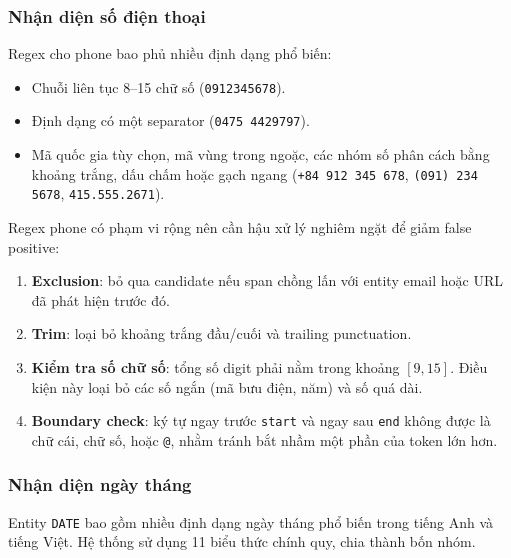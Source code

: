 \subsubsection{Nhận diện số điện thoại}

Regex cho phone bao phủ nhiều định dạng phổ biến:

\begin{itemize}[nosep]
      \item Chuỗi liên tục 8--15 chữ số (\texttt{0912345678}).
      \item Định dạng có một separator (\texttt{0475 4429797}).
      \item Mã quốc gia tùy chọn, mã vùng trong ngoặc, các nhóm số phân cách
            bằng khoảng trắng, dấu chấm hoặc gạch ngang
            (\texttt{+84 912 345 678}, \texttt{(091) 234 5678},
            \texttt{415.555.2671}).
\end{itemize}

Regex phone có phạm vi rộng nên cần hậu xử lý nghiêm ngặt để giảm false
positive:

\begin{enumerate}[nosep]
      \item \textbf{Exclusion}: bỏ qua candidate nếu span chồng lấn với entity
            email hoặc URL đã phát hiện trước đó.
      \item \textbf{Trim}: loại bỏ khoảng trắng đầu/cuối và trailing punctuation.
      \item \textbf{Kiểm tra số chữ số}: tổng số digit phải nằm trong khoảng
            $[9, 15]$. Điều kiện này loại bỏ các số ngắn (mã bưu điện, năm)
            và số quá dài.
      \item \textbf{Boundary check}: ký tự ngay trước \texttt{start} và ngay sau
            \texttt{end} không được là chữ cái, chữ số, hoặc \texttt{@}, nhằm
            tránh bắt nhầm một phần của token lớn hơn.
\end{enumerate}

\subsubsection{Nhận diện ngày tháng}
\label{sec:date_detection}

Entity \texttt{DATE} bao gồm nhiều định dạng ngày tháng phổ biến trong tiếng
Anh và tiếng Việt. Hệ thống sử dụng 11 biểu thức chính quy, chia thành bốn
nhóm.

